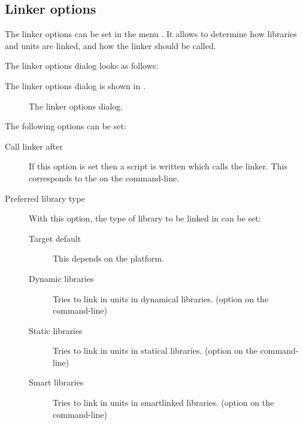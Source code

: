 \subsection{Linker options}
The linker options can be set in the menu . It allows
to determine how libraries and units are linked, and how the linker should
be called. 
\begin{htmlonly}
The linker options dialog looks as follows:
\end{htmlonly}
\begin{latexonly}
The linker options dialog is shown in
.
\begin{figure}[ht]
\begin{center}
\caption{The linker options dialog.}\label{fig:olinker}
\ifpdf
{}
\else
{}
\fi
\end{center}
\end{figure}
\end{latexonly}
The following options can be set:
\begin{description}
\item[Call linker after] If this option is set then a script is written
which calls the linker. This corresponds to the  on the
command-line.
\item[Preferred library type] With this option, the type of library to be
linked in can be set:
\begin{description}
\item[Target default] This depends on the platform.
\item[Dynamic libraries] Tries to link in units in dynamical libraries. 
(option  on the command-line)
\item[Static libraries] Tries to link in units in statical libraries.
(option  on the command-line)
\item[Smart libraries] Tries to link in units in smartlinked libraries.
(option  on the command-line)
\end{description}
\end{description}
%
%
